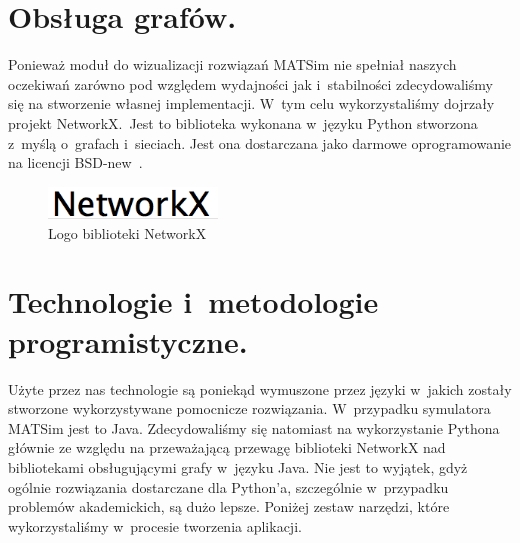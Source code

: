 \documentclass[twoside,12pt]{report}
\begin{document}
\section{Obsługa grafów.}

Ponieważ moduł do wizualizacji rozwiązań MATSim nie spełniał naszych oczekiwań zarówno pod względem wydajności jak i~stabilności zdecydowaliśmy się na stworzenie własnej implementacji. W~tym celu wykorzystaliśmy dojrzały projekt NetworkX.~Jest to biblioteka wykonana w~języku Python stworzona z~myślą o~grafach i~sieciach. Jest ona dostarczana jako darmowe oprogramowanie na licencji BSD-new~\cite{networkx}. 

\begin{figure}[ht]
\centering
\includegraphics[width=0.40\textwidth]{img/networkx}
\caption{Logo biblioteki NetworkX} 
\end{figure}

\section{Technologie i~metodologie programistyczne.}

Użyte przez nas technologie są poniekąd wymuszone przez języki w~jakich zostały stworzone wykorzystywane pomocnicze rozwiązania. W~przypadku symulatora MATSim jest to Java. Zdecydowaliśmy się natomiast na wykorzystanie Pythona głównie ze względu na przeważającą przewagę biblioteki NetworkX nad bibliotekami obsługującymi grafy w~języku Java. Nie jest to wyjątek, gdyż ogólnie rozwiązania dostarczane dla Python'a, szczególnie w~przypadku problemów akademickich, są dużo lepsze. Poniżej zestaw narzędzi, które wykorzystaliśmy w~procesie tworzenia aplikacji.  
\end{document}
